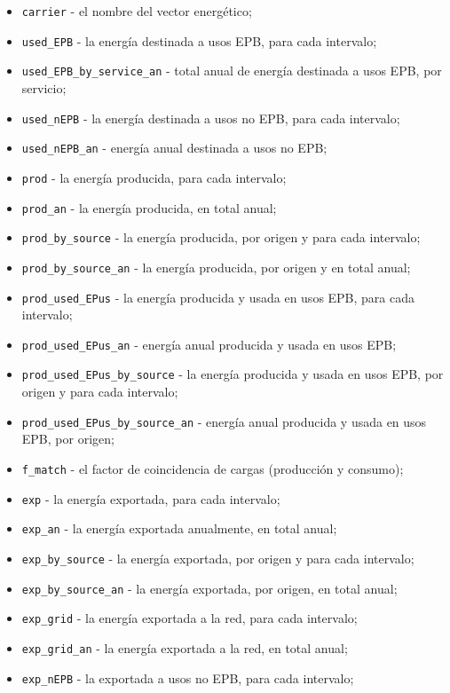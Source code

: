 \documentclass[10pt,notitlepage,oneside,a4paper]{article}
\begin{document}
\begin{itemize}
\item \texttt{carrier} - el nombre del vector energético;
\item \texttt{used\_EPB} - la energía destinada a usos EPB, para cada intervalo;
\item \texttt{used\_EPB\_by\_service\_an} - total anual de energía destinada a usos EPB, por servicio;
\item \texttt{used\_nEPB} - la energía destinada a usos no EPB, para cada intervalo;
\item \texttt{used\_nEPB\_an} - energía anual destinada a usos no EPB;
\item \texttt{prod} - la energía producida, para cada intervalo;
\item \texttt{prod\_an} - la energía producida, en total anual;
\item \texttt{prod\_by\_source} - la energía producida, por origen y para cada intervalo;
\item \texttt{prod\_by\_source\_an} - la energía producida, por origen y en total anual;
\item \texttt{prod\_used\_EPus} - la energía producida y usada en usos EPB, para cada intervalo;
\item \texttt{prod\_used\_EPus\_an} - energía anual producida y usada en usos EPB;
\item \texttt{prod\_used\_EPus\_by\_source} - la energía producida y usada en usos EPB, por origen y para cada intervalo;
\item \texttt{prod\_used\_EPus\_by\_source\_an} - energía anual producida y usada en usos EPB, por origen;
\item \texttt{f\_match} - el factor de coincidencia de cargas (producción y consumo);
\item \texttt{exp} - la energía exportada, para cada intervalo;
\item \texttt{exp\_an} - la energía exportada anualmente, en total anual;
\item \texttt{exp\_by\_source} - la energía exportada, por origen y para cada intervalo;
\item \texttt{exp\_by\_source\_an} - la energía exportada, por origen, en total anual;
\item \texttt{exp\_grid} - la energía exportada a la red, para cada intervalo;
\item \texttt{exp\_grid\_an} - la energía exportada a la red, en total anual;
\item \texttt{exp\_nEPB} - la exportada a usos no EPB, para cada intervalo;

\end{itemize}
\end{document}
